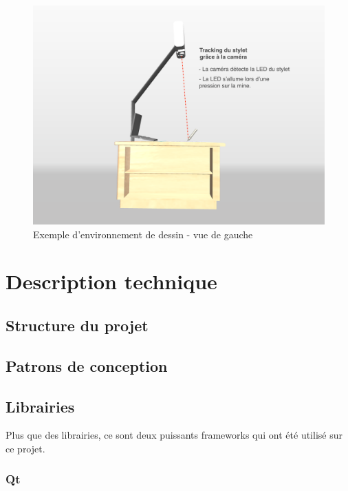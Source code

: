 \documentclass[11pt,a4paper,oldfontcommands]{memoir}
\begin{document}
\newpage

\begin{figure}[h]
\centering
\includegraphics[angle=90, scale=0.15]{images/drawing-environment-side.png}
\caption{Exemple d'environnement de dessin - vue de gauche}
\end{figure}


\chapter{Description technique}

\section{Structure du projet}

\section{Patrons de conception}

\section{Librairies}

Plus que des librairies, ce sont deux puissants frameworks qui ont été utilisé sur ce projet. 

\subsection{Qt}
\end{document}

